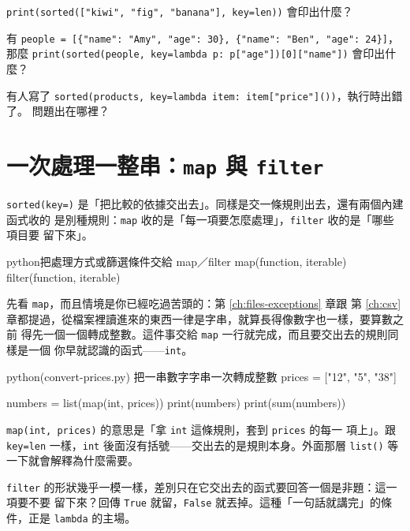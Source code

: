 \begin{drills}[label=drills:key-function]
\item \texttt{print(sorted(["kiwi", "fig", "banana"], key=len))} 會印出什麼？
\item 有 \texttt{people = [\{"name": "Amy", "age": 30\}, \{"name": "Ben", "age": 24\}]}，
那麼 \texttt{print(sorted(people, key=lambda p: p["age"])[0]["name"])} 會印出什麼？
\item 有人寫了 \texttt{sorted(products, key=lambda item: item["price"]())}，執行時出錯了。
問題出在哪裡？
\end{drills}

\section{一次處理一整串：\texttt{map} 與 \texttt{filter}}
\label{sec:map-filter}

\texttt{sorted(key=)} 是「把比較的依據交出去」。同樣是交一條規則出去，還有兩個內建函式收的
是別種規則：\texttt{map} 收的是「每一項要怎麼處理」，\texttt{filter} 收的是「哪些項目要
留下來」。

\begin{code}{python}{把處理方式或篩選條件交給 map／filter}
map(function, iterable)
filter(function, iterable)
\end{code}

先看 \texttt{map}，而且情境是你已經吃過苦頭的：第 \ref{ch:files-exceptions} 章跟
第 \ref{ch:csv} 章都提過，從檔案裡讀進來的東西一律是字串，就算長得像數字也一樣，要算數之前
得先一個一個轉成整數。這件事交給 \texttt{map} 一行就完成，而且要交出去的規則同樣是一個
你早就認識的函式——\texttt{int}。

\begin{example}{python}{(convert-prices.py) 把一串數字字串一次轉成整數}
prices = ["12", "5", "38"]

numbers = list(map(int, prices))
print(numbers)
print(sum(numbers))
\end{example}


\texttt{map(int, prices)} 的意思是「拿 \texttt{int} 這條規則，套到 \texttt{prices} 的每一
項上」。跟 \texttt{key=len} 一樣，\texttt{int} 後面沒有括號——交出去的是規則本身。外面那層
\texttt{list()} 等一下就會解釋為什麼需要。

\texttt{filter} 的形狀幾乎一模一樣，差別只在它交出去的函式要回答一個是非題：這一項要不要
留下來？回傳 \texttt{True} 就留，\texttt{False} 就丟掉。這種「一句話就講完」的條件，正是
\texttt{lambda} 的主場。

